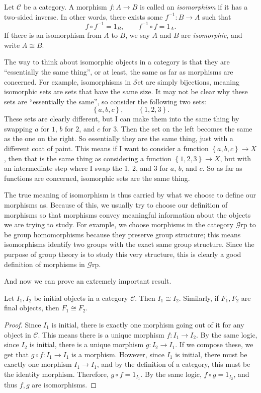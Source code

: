 \documentclass[11pt, letterpaper]{article}
\newcommand{\Set}{\mathcal{S}\mathrm{et}}
\newcommand{\Grp}{\mathcal{G}\mathrm{rp}}
\begin{document}
\begin{definition}[Isomorphism]\label{dfn:4}
	Let $\mathcal{C} $ be a category. A morphism $f : A \to B$ is called an \emph{isomorphism} if it has a two-sided inverse. In other words, there exists some $f^{-1} : B \to A$ such that
	\[
		f\circ f^{-1} =1_B,\qquad f^{-1} \circ f=1_A
	.\]
	If there is an isomorphism from $A$ to $B$, we say $A$ and $B$ are \emph{isomorphic}, and write $A\cong B$.
\end{definition}

The way to think about isomorphic objects in a category is that they are ``essentially the same thing'', or at least, the same as far as morphisms are concerned. For example, isomorphisms in $\Set $ are simply bijections, meaning isomorphic sets are sets that have the same size. It may not be clear why these sets are ``essentially the same'', so consider the following two sets:
\[
	\left\{ a,b,c \right\} ,\qquad \left\{ 1,2,3 \right\} 
.\]
These sets are clearly different, but I can make them into the same thing by swapping $a$ for $1$, $b$ for $2$, and $c$ for $3$. Then the set on the left becomes the same as the one on the right. So essentially they are the same thing, just with a different coat of paint. This means if I want to consider a function $\left\{ a,b,c \right\} \to X$, then that is the same thing as considering a function $\left\{ 1,2,3 \right\} \to X$, but with an intermediate step where I swap the 1, 2, and 3 for $a$, $b$, and $c$. So as far as functions are concerned, isomorphic sets are the same thing.

The true meaning of isomorphism is thus carried by what we choose to define our morphisms as. Because of this, we usually try to choose our definition of morphisms so that morphisms convey meaningful information about the objects we are trying to study. For example, we choose morphisms in the category $\Grp $ to be group homomorphisms because they preserve group structure; this means isomorphisms identify two groups with the exact same group structure. Since the purpose of group theory is to study this very structure, this is clearly a good definition of morphisms in $\Grp $.

And now we can prove an extremely important result.
\begin{theorem}\label{thm:1}
	Let $I_1,I_2$ be initial objects in a category $\mathcal{C} $. Then $I_1 \cong I_2$. Similarly, if $F_1,F_2$ are final objects, then $F_1\cong F_2$.
\end{theorem}
\begin{proof}
	Since $I_1$ is initial, there is exactly one morphism going out of it for any object in $\mathcal{C} $. This means there is a unique morphism $f : I_1 \to I_2$. By the same logic, since $I_2$ is initial, there is a unique morphism $g : I_2 \to I_1$. If we compose these, we get that $g\circ f: I_1 \to I_1$ is a morphism. However, since $I_1$ is initial, there must be exactly one morphism $I_1\to I_1$, and by the definition of a category, this must be the identity morphism. Therefore, $g\circ f=1_{I_1} $. By the same logic, $f\circ g=1_{I_2} $, and thus $f,g$ are isomorphisms.
\end{proof}
\end{document}

